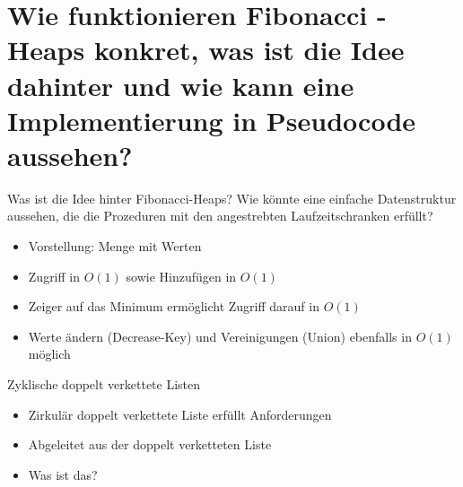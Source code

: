 \documentclass{beamer}
\newif\ifpauseswitch
\begin{document}
		\section[Wie funktionieren Fibonacci - Heaps konkret, was ist die Idee dahinter und wie kann eine Implementierung in Pseudocode aussehen?]{Wie funktionieren Fibonacci - Heaps konkret, was ist die Idee dahinter und wie kann eine Implementierung in Pseudocode aussehen?}
		
		\begin{frame} {Was ist die Idee hinter Fibonacci-Heaps?}
			Wie k\"onnte eine einfache Datenstruktur aussehen, die die Prozeduren mit den angestrebten Laufzeitschranken erf\"ullt?
			\ifpauseswitch
				\pause
			\fi
			\begin{itemize}
				\item Vorstellung: Menge mit Werten
				\item Zugriff in $O(1)$ sowie  Hinzuf\"ugen in $O(1)$ 
				\item Zeiger auf das Minimum ermöglicht Zugriff darauf in $O(1)$
				\item Werte \"andern (Decrease-Key) und Vereinigungen (Union) ebenfalls in $O(1)$ möglich
			\end{itemize}
			
			\begin{figure}[h]
				\centering %
				\hfill
			\end{figure}
		\end{frame}
			
			\begin{frame}{Zyklische doppelt verkettete Listen}
				\begin{itemize}
					\item Zirkulär doppelt verkettete Liste erfüllt Anforderungen
					\item Abgeleitet aus der doppelt verketteten Liste
					\item Was ist das?
				\end{itemize}
			\end{frame}
			
\end{document}
